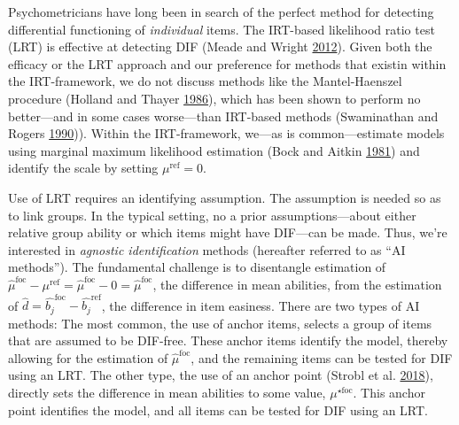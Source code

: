 \documentclass[
  11pt,
]{article}
\begin{document}
Psychometricians have long been in search of the perfect method for detecting differential functioning of \emph{individual} items. The IRT-based likelihood ratio test (LRT) is effective at detecting DIF (Meade and Wright \protect\hyperlink{ref-meade2012solving}{2012}). Given both the efficacy or the LRT approach and our preference for methods that existin within the IRT-framework, we do not discuss methods like the Mantel-Haenszel procedure (Holland and Thayer \protect\hyperlink{ref-holland1986differential}{1986}), which has been shown to perform no better---and in some cases worse---than IRT-based methods (Swaminathan and Rogers \protect\hyperlink{ref-swaminathan1990detecting}{1990})). Within the IRT-framework, we---as is common---estimate models using marginal maximum likelihood estimation (Bock and Aitkin \protect\hyperlink{ref-bock1981marginal}{1981}) and identify the scale by setting \(\mu^\text{ref} = 0\).

Use of LRT requires an identifying assumption. The assumption is needed so as to link groups. In the typical setting, no a prior assumptions---about either relative group ability or which items might have DIF---can be made. Thus, we're interested in \emph{agnostic identification} methods (hereafter referred to as \enquote{AI methods}). The fundamental challenge is to disentangle estimation of \(\hat\mu^\text{foc} - \mu^\text{ref} = \hat\mu^\text{foc} - 0 = \hat\mu^\text{foc}\), the difference in mean abilities, from the estimation of \(\hat d = \hat{b_j}^{\text{foc}} - \hat{b_j}^{\text{ref}}\), the difference in item easiness. There are two types of AI methods: The most common, the use of anchor items, selects a group of items that are assumed to be DIF-free. These anchor items identify the model, thereby allowing for the estimation of \(\hat\mu^\text{foc}\), and the remaining items can be tested for DIF using an LRT. The other type, the use of an anchor point (Strobl et al. \protect\hyperlink{ref-strobl2018anchor}{2018}), directly sets the difference in mean abilities to some value, \(\mu^{\star\text{foc}}\). This anchor point identifies the model, and all items can be tested for DIF using an LRT.
\end{document}
